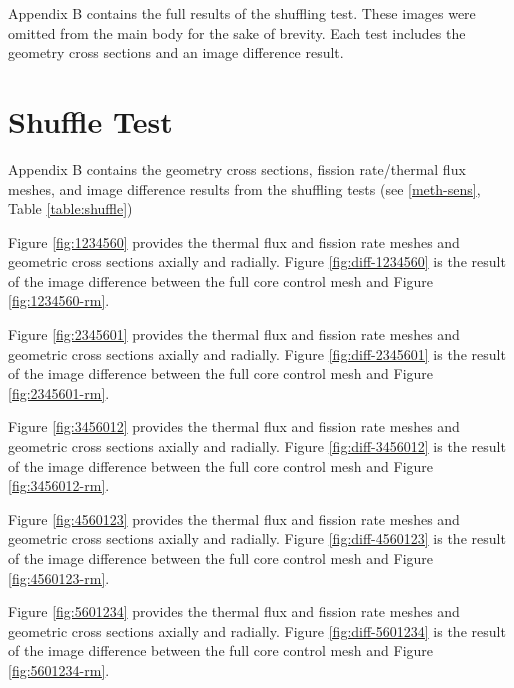 Appendix B contains the full results of the shuffling test.  These images were omitted from the main body for the sake of brevity.  Each test includes the geometry cross sections and an image difference result.

\section{Shuffle Test}
\label{app-shuf}
Appendix B contains the geometry cross sections, fission rate/thermal flux meshes, and image difference results from the shuffling tests (see \autoref{meth-sens}, Table \ref{table:shuffle})





Figure \ref{fig:1234560} provides the thermal flux and fission rate meshes and geometric cross sections axially and radially.  Figure \ref{fig:diff-1234560} is the result of the image difference between the full core control mesh and Figure \ref{fig:1234560-rm}.




Figure \ref{fig:2345601} provides the thermal flux and fission rate meshes and geometric cross sections axially and radially.  Figure \ref{fig:diff-2345601} is the result of the image difference between the full core control mesh and Figure \ref{fig:2345601-rm}.




Figure \ref{fig:3456012} provides the thermal flux and fission rate meshes and geometric cross sections axially and radially.  Figure \ref{fig:diff-3456012} is the result of the image difference between the full core control mesh and Figure \ref{fig:3456012-rm}.




Figure \ref{fig:4560123} provides the thermal flux and fission rate meshes and geometric cross sections axially and radially.  Figure \ref{fig:diff-4560123} is the result of the image difference between the full core control mesh and Figure \ref{fig:4560123-rm}.




Figure \ref{fig:5601234} provides the thermal flux and fission rate meshes and geometric cross sections axially and radially.  Figure \ref{fig:diff-5601234} is the result of the image difference between the full core control mesh and Figure \ref{fig:5601234-rm}.


